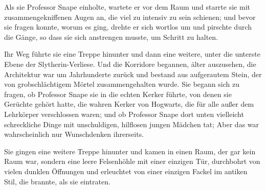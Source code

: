 Als sie Professor Snape einholte, wartete er vor dem Raum und starrte sie mit zusammengekniffenen Augen an, die viel zu intensiv zu sein schienen; und bevor sie fragen konnte, worum es ging, drehte er sich wortlos um und pirschte durch die Gänge, so dass sie sich anstrengen musste, um Schritt zu halten.

Ihr Weg führte sie eine Treppe hinunter und dann eine weitere, unter die unterste Ebene der Slytherin-Verliese. Und die Korridore begannen, älter auszusehen, die Architektur war um Jahrhunderte zurück und bestand aus aufgerautem Stein, der von grobschlächtigem Mörtel zusammengehalten wurde. Sie begann sich zu fragen, ob Professor Snape sie in die echten Kerker führte, von denen sie Gerüchte gehört hatte, die wahren Kerker von Hogwarts, die für alle außer dem Lehrkörper verschlossen waren; und ob Professor Snape dort unten vielleicht schreckliche Dinge mit unschuldigen, hilflosen jungen Mädchen tat; Aber das war wahrscheinlich nur Wunschdenken ihrerseits.

Sie gingen eine weitere Treppe hinunter und kamen in einen Raum, der gar kein Raum war, sondern eine leere Felsenhöhle mit einer einzigen Tür, durchbohrt von vielen dunklen Öffnungen und erleuchtet von einer einzigen Fackel im antiken Stil, die brannte, als sie eintraten.

